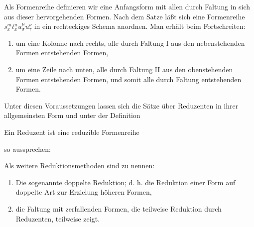 Als \glqq{}Formenreihe\grqq{} definieren wir eine Anfangsform mit allen durch Faltung in sich aus dieser hervorgehenden Formen. Nach dem Satze läßt sich eine Formenreihe $s_x^m t_x^n u_\sigma^\mu u_\tau^\nu$ in ein rechteckiges Schema anordnen. Man erhält beim Fortschreiten:
\begin{enumerate}
\item um eine Kolonne nach rechts, alle durch Faltung I aus den nebenstehenden Formen entstehenden Formen,
\item um eine Zeile nach unten, alle durch Faltung II aus den obenstehenden Formen entstehenden Formen, und somit alle durch Faltung entstehenden Formen.
\end{enumerate}

Unter diesen Voraussetzungen lassen sich die Sätze über Reduzenten in ihrer allgemeinsten Form und unter der Definition
\begin{center}
\glqq{}Ein Reduzent ist eine reduzible Formenreihe\grqq{}
\end{center}
so aussprechen:

\begin{center}
\end{center}

Als weitere Reduktionsmethoden sind zu nennen:
\begin{enumerate}
\item Die sogenannte \glqq{}doppelte Reduktion\grqq{}; d. h. die Reduktion einer Form auf doppelte Art zur Erzielung  höheren Formen,
\item die \glqq{}Faltung mit zerfallenden Formen\grqq{}, die teilweise  Reduktion durch Reduzenten, teilweise  zeigt.
\end{enumerate}
